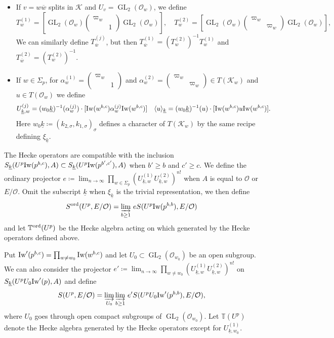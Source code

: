 \documentclass[leqno]{amsart}
\theoremstyle{definition}
\theoremstyle{remark}
\newcommand{\smat}[1]{\left(\begin{smallmatrix} #1 \end{smallmatrix}\right)}
\newcommand{\oo}{\mathcal{O}}
\DeclareMathOperator{\GL}{GL}
\newcommand{\K}{{\mathcal{K}}} %
\newcommand{\bw}{{\overline{w}}}
\newcommand{\wt}[1]{\underline{ #1 }}
\newcommand{\Iw}{\textnormal{Iw}} %
\newcommand{\TT}{\mathbb{T}} %
\newcommand{\ord}{\textnormal{ord}} %
\begin{document}
\begin{itemize}
\item If $v=w\bw$ splits in $\K$ and $U_v=\GL_2(\oo_w)$, we define
\begin{equation*}
	T_w^{(1)}=
	\left[
	\GL_2(\oo_w)
	\begin{pmatrix}
		\varpi_w&\\&1
	\end{pmatrix}
	\GL_2(\oo_w)
	\right],\quad
	T_w^{(2)}=
	\left[
	\GL_2(\oo_w)
	\begin{pmatrix}
		\varpi_w&\\&\varpi_w
	\end{pmatrix}
	\GL_2(\oo_w)
	\right],
\end{equation*}
We can similarly define $T^{(j)}_\bw$, but then 
$T_{\bw}^{(1)}=(T_{w}^{(2)})^{-1}T_w^{(1)}$ and
$T_{\bw}^{(2)}=(T_{w}^{(2)})^{-1}$.
\item
If $w\in \Sigma_p$, for 
$\alpha_w^{(1)}=\smat{\varpi_w&\\&1}$ and
$\alpha_w^{(2)}=\smat{\varpi_w&\\&\varpi_w}\in T(\K_w)$
and $u\in T(\oo_w)$
we define
\begin{equation*}
	U_{\wt{k},w}^{(j)}=
	(w_0\wt{k})^{-1}(\alpha_{w}^{(j)})\cdot
	[\Iw(w^{b,c})\alpha_w^{(j)}\Iw(w^{b,c})]\quad
    \langle u\rangle_{\wt{k}}=
	(w_0\wt{k})^{-1}(u)\cdot
	[\Iw(w^{b,c})u\Iw(w^{b,c})].
\end{equation*}
Here $w_0\wt{k}\coloneqq(k_{2,\sigma},k_{1,\sigma})_\sigma$ defines a character
of $T(\K_w)$ by the same recipe defining $\xi_{\wt{k}}$.
\end{itemize}

The Hecke operators are compatible with the inclusion
$S_{\wt{k}}(U^p\Iw(p^{b,c}),A)\subset S_{\wt{k}}(U^p\Iw(p^{b',c'}),A)$
when $b'\geq b$ and $c'\geq c$. 
We define the ordinary projector 
$e\coloneqq\lim_{n\to \infty}\prod_{w\in\Sigma_p}
(U_{\wt{k},w}^{(1)}U_{\wt{k},w}^{(2)})^{n!}$
when $A$ is equal to $\oo$ or $E/\oo$.
Omit the subscript $\wt{k}$
when $\xi_{\wt{k}}$ is the trivial representation, we then define
\[
    S^{\ord}(U^p,E/\oo)=\varinjlim_{b\geq 1}\,eS(U^p\Iw(p^{b,b}),E/\oo)
\]
and let $\TT^{\ord}(U^p)$ be the Hecke algebra acting on which 
generated by the Hecke operators defined above.


Put $\Iw'(p^{b,c})=\prod_{w\neq w_0}\Iw(w^{b,c})$ 
and let $U_0\subset \GL_2(\oo_{w_0})$ be an open subgroup.
We can also consider the projector
$e'\coloneqq\lim_{n\to \infty}\prod_{w\neq w_0}
(U_{\wt{k},w}^{(1)}U_{\wt{k},w}^{(2)})^{n!}$
on $S_{\wt{k}}(U^pU_0\Iw'(p),A)$ and define
\[
    S(U^p,E/\oo)=
    \varinjlim_{U_0}\varinjlim_{b\geq 1}\,e'S(U^pU_0\Iw'(p^{b,b}),E/\oo),
\]
where $U_0$ goes through open compact subgroups of $\GL_2(\oo_{w_0})$.
Let $\TT(U^p)$ denote the Hecke algebra
generated by the Hecke operators except for $U_{\wt{k},w_0}^{(1)}$.
\end{document}
